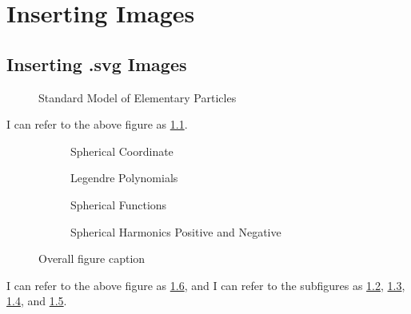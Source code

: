 \documentclass[oneside,10pt]{book}
\begin{document}
\chapter{Inserting Images}

\section{Inserting .svg Images}
\begin{figure}[H]
    \centering
    
    \caption{Standard Model of Elementary Particles}
    \label{fig:standard-model-label}
\end{figure}
I can refer to the above figure as \ref{fig:standard-model-label}.

\begin{figure}[H]
    \centering
    \begin{subfigure}{0.45\textwidth}
        
        \caption{Spherical Coordinate}
        \label{fig:spherical-coordinate-label}
    \end{subfigure}
    \hfill
    \begin{subfigure}{0.45\textwidth}
        
        \caption{Legendre Polynomials}
        \label{fig:legendre-polynomials-label}
    \end{subfigure}

    \vspace{0.5cm} %

    \begin{subfigure}{0.45\textwidth}
        
        \caption{Spherical Functions}
        \label{fig:spherical-functions-label}
    \end{subfigure}
    \hfill
    \begin{subfigure}{0.45\textwidth}
        
        \caption{Spherical Harmonics Positive and Negative}
        \label{fig:spherical-harmonics-positive-negative-label}
    \end{subfigure}

    \caption{Overall figure caption}
    \label{fig:2x2grid}
\end{figure}

I can refer to the above figure as \ref{fig:2x2grid}, and I can refer to the subfigures as \ref{fig:spherical-coordinate-label}, \ref{fig:legendre-polynomials-label}, \ref{fig:spherical-functions-label}, and \ref{fig:spherical-harmonics-positive-negative-label}.
\end{document}

